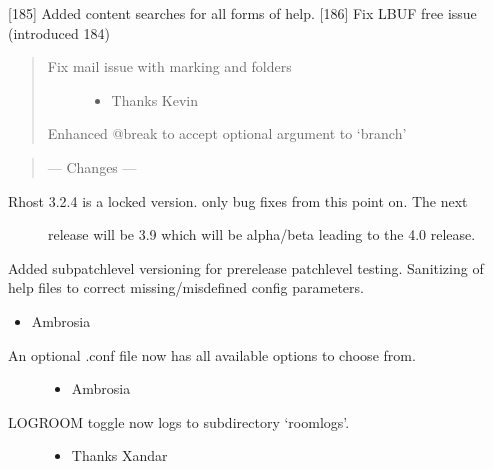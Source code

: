 \documentclass[letterpaper,10pt,english]{sphinxmanual}
\begin{document}
\sphinxAtStartPar
{[}18\sphinxhyphen{}5{]} Added content searches for all forms of help.
{[}18\sphinxhyphen{}6{]} Fix LBUF free issue (introduced 18\sphinxhyphen{}4)
\begin{quote}
\begin{description}
\item[{Fix mail issue with marking and folders}] \leavevmode\begin{itemize}
\item {} 
\sphinxAtStartPar
Thanks Kevin

\end{itemize}

\end{description}

\sphinxAtStartPar
Enhanced @break to accept optional argument to ‘branch’
\end{quote}
\begin{quote}

\sphinxAtStartPar
—\sphinxhyphen{} Changes —\sphinxhyphen{}
\end{quote}
\begin{description}
\item[{Rhost 3.2.4 is a locked version.  only bug fixes from this point on.  The next}] \leavevmode
\sphinxAtStartPar
release will be 3.9 which will be alpha/beta leading to the 4.0 release.

\end{description}

\sphinxAtStartPar
Added sub\sphinxhyphen{}patchlevel versioning for pre\sphinxhyphen{}release patchlevel testing.
Sanitizing of help files to correct missing/misdefined config parameters.
\begin{itemize}
\item {} 
\sphinxAtStartPar
Ambrosia

\end{itemize}
\begin{description}
\item[{An optional .conf file now has all available options to choose from.}] \leavevmode\begin{itemize}
\item {} 
\sphinxAtStartPar
Ambrosia

\end{itemize}

\item[{LOGROOM toggle now logs to subdirectory ‘roomlogs’.}] \leavevmode\begin{itemize}
\item {} 
\sphinxAtStartPar
Thanks Xandar

\end{itemize}

\end{description}
\end{document}

